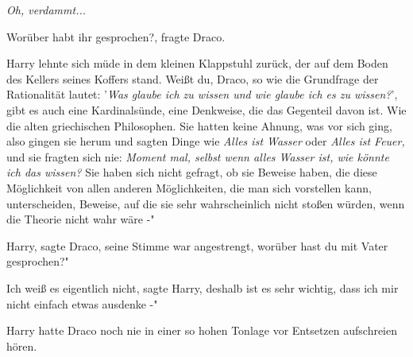 \emph{Oh, verdammt...}

\glqq{}Worüber habt ihr gesprochen?\grqq{}, fragte Draco.

Harry lehnte sich müde in dem kleinen Klappstuhl zurück, der auf dem Boden des
Kellers seines Koffers stand. \glqq{}Weißt du, Draco, so wie die Grundfrage der
Rationalität lautet: '\emph{Was glaube ich zu wissen und wie glaube ich es zu
wissen?}', gibt es auch eine Kardinalsünde, eine Denkweise, die das Gegenteil
davon ist. Wie die alten griechischen Philosophen. Sie hatten keine Ahnung, was
vor sich ging, also gingen sie herum und sagten Dinge wie \emph{\glqq{}Alles ist
Wasser\grqq{}} oder \emph{\glqq{}Alles ist Feuer\grqq{},} und sie fragten sich
nie:\emph{ \glqq{}Moment mal, selbst wenn alles Wasser ist, wie könnte ich das
wissen?} Sie haben sich nicht gefragt, ob sie Beweise haben, die diese
Möglichkeit von allen anderen Möglichkeiten, die man sich vorstellen kann,
unterscheiden, Beweise, auf die sie sehr wahrscheinlich nicht stoßen würden,
wenn die Theorie nicht wahr wäre -"

\glqq{}Harry\grqq{}, sagte Draco, seine Stimme war angestrengt, \glqq{}worüber
hast du mit Vater gesprochen?"

\glqq{}Ich weiß es eigentlich nicht\grqq{}, sagte Harry, \glqq{}deshalb ist es
sehr wichtig, dass ich mir nicht einfach etwas ausdenke -"

Harry hatte Draco noch nie in einer so hohen Tonlage vor Entsetzen aufschreien
hören.

